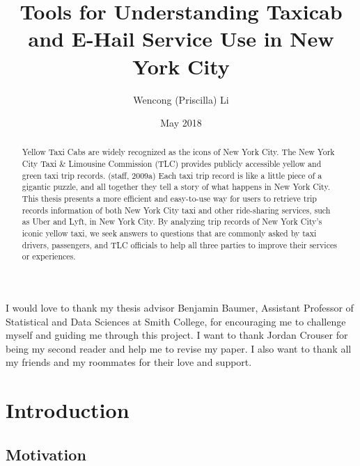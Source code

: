 \documentclass[12pt,twoside]{reedthesis}
\title{Tools for Understanding Taxicab and E-Hail Service Use in New York City}
\author{Wencong (Priscilla) Li}
\date{May 2018}
\theoremstyle{definition}
\theoremstyle{definition}
\theoremstyle{definition}
\theoremstyle{remark}
\begin{document}
  \maketitle

\frontmatter %
\pagestyle{empty} %
  \begin{acknowledgements}
    I would love to thank my thesis advisor Benjamin Baumer, Assistant
    Professor of Statistical and Data Sciences at Smith College, for
    encouraging me to challenge myself and guiding me through this project.
    I want to thank Jordan Crouser for being my second reader and help me to
    revise my paper. I also want to thank all my friends and my roommates
    for their love and support.
  \end{acknowledgements}

  \hypersetup{linkcolor=black}
  \setcounter{tocdepth}{2}
  \tableofcontents

  \listoftables

  \listoffigures
  \begin{abstract}
    Yellow Taxi Cabs are widely recognized as the icons of New York City.
    The New York City Taxi \& Limousine Commission (TLC) provides publicly
    accessible yellow and green taxi trip records. (staff, 2009a) Each taxi
    trip record is like a little piece of a gigantic puzzle, and all
    together they tell a story of what happens in New York City. This thesis
    presents a more efficient and easy-to-use way for users to retrieve trip
    records information of both New York City taxi and other ride-sharing
    services, such as Uber and Lyft, in New York City. By analyzing trip
    records of New York City's iconic yellow taxi, we seek answers to
    questions that are commonly asked by taxi drivers, passengers, and TLC
    officials to help all three parties to improve their services or
    experiences.
  \end{abstract}

\mainmatter %
\pagestyle{fancyplain} %

\chapter{Introduction}\label{introduction}

\section{Motivation}\label{motivation}
\end{document}
